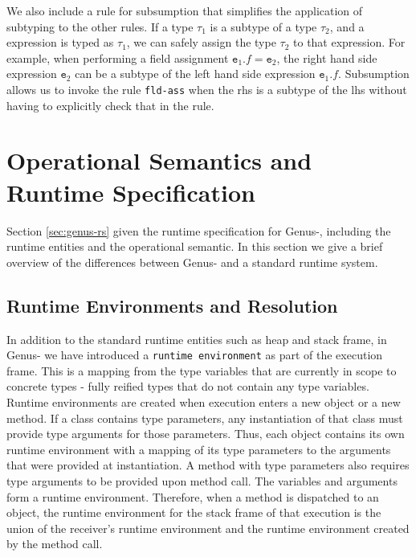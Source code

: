 We also include a rule for subsumption that simplifies the application of subtyping to the other rules. If a type $\tau_1$ is a subtype of a type $\tau_2$, and a expression is typed as $\tau_1$, we can safely assign the type $\tau_2$ to that expression. For example, when performing a field assignment $\texttt{e}_1.f = \texttt{e}_2$, the right hand side expression $\texttt{e}_2$ can be a subtype of the left hand side expression $\texttt{e}_1.f$. Subsumption allows us to invoke the rule \texttt{fld-ass} when the rhs is a subtype of the lhs without having to explicitly check that in the rule.

\newpage 

\section{Operational Semantics and Runtime Specification} \label{sec:genus-opsem}

Section \ref{sec:genus-rs} given the runtime specification for Genus-, including the runtime entities and the operational semantic. In this section we give a brief overview of the differences between Genus- and a standard runtime system.

\subsection{Runtime Environments and Resolution}

In addition to the standard runtime entities such as heap and stack frame, in Genus- we have introduced a \texttt{runtime environment} as part of the execution frame. This is a mapping from the type variables that are currently in scope to concrete types - fully reified types that do not contain any type variables. \\

Runtime environments are created when execution enters a new object or a new method. If a class contains type parameters, any instantiation of that class must provide type arguments for those parameters. Thus, each object contains its own runtime environment with a mapping of its type parameters to the arguments that were provided at instantiation. A method with type parameters also requires type arguments to be provided upon method call. The variables and arguments form a runtime environment. Therefore, when a method is dispatched to an object, the runtime environment for the stack frame of that execution is the union of the receiver's runtime environment and the runtime environment created by the method call. \\

